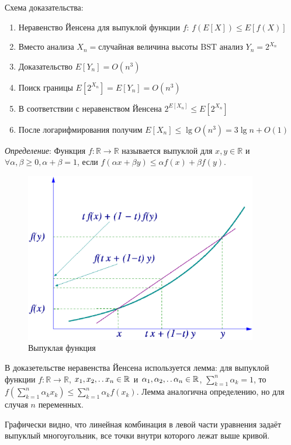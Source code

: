 Схема доказательства:
\begin{enumerate}
\item Неравенство Йенсена для выпуклой функции $f$: $f(E[X]) \leqslant E[f(X)]$
\item Вместо анализа $X_n = \text{случайная величина высоты BST}$ анализ $Y_n = 2^{X_n}$
\item Доказательство $E[Y_n] = O(n^3)$
\item Поиск границы $E[2^{X_n}] = E[Y_n] = O(n^3)$
\item В соответствии с неравенством Йенсена $2^{E[X_n]} \leqslant E[2^{X_n}]$
\item После логарифмирования получим $E[X_n] \leqslant \lg O(n^3) = 3\lg n + O(1)$
\end{enumerate}

\emph{Определение}: Функция $f \colon \mathbb{R}\to\mathbb{R}$ называется выпуклой для $x, y \in \mathbb{R}$ и $\forall \alpha, \beta \geqslant 0, \alpha+\beta=1$, если $f(\alpha x + \beta y) \leqslant \alpha f(x) + \beta f(y)$.
\begin{figure}[ht]
  \centering
  \includegraphics[width=4in]{lecture9/convex.eps}
  \caption{Выпуклая функция}
  \label{fig:convex}
\end{figure}

В доказетельстве неравенства Йенсена используется лемма: для выпуклой функции $f \colon \mathbb{R}\to\mathbb{R}$, $x_1, x_2, \mathinner{\ldotp\ldotp} x_n \in \mathbb{R}$ и $\alpha_1, \alpha_2, \mathinner{\ldotp\ldotp} \alpha_n \in \mathbb{R}$, $\sum_{k=1}^{n}\alpha_k = 1$, то $f(\sum_{k=1}^{n} \alpha_k x_k) \leqslant \sum_{k=1}^{n} \alpha_k f(x_k)$. Лемма аналогична определению, но для случая $n$ переменных.

Графически видно, что линейная комбинация в левой части уравнения задаёт выпуклый многоугольник, все точки внутри которого лежат выше кривой.

